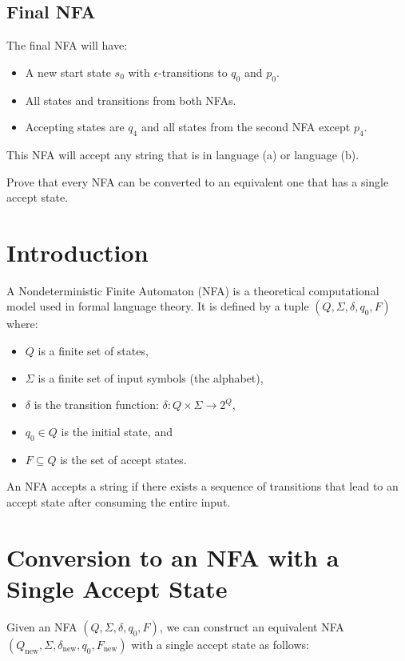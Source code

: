 \documentclass[12pt]{article}
\begin{document}
	\subsection*{Final NFA}
	The final NFA will have:
	\begin{itemize}
		\item A new start state $s_0$ with $\epsilon$-transitions to $q_0$ and $p_0$.
		\item All states and transitions from both NFAs.
		\item Accepting states are $q_4$ and all states from the second NFA except $p_4$.
	\end{itemize}
	
	This NFA will accept any string that is in language (a) or language (b).
	\newpage
	\begin{tcolorbox}[
		title=\textbf{Question 5},
		colback=white,
		colframe=transitioncol,
		arc=0mm
		]
		Prove that every NFA can be converted to an equivalent one that has a single accept state.
	\end{tcolorbox}
	\section{Introduction}
	A Nondeterministic Finite Automaton (NFA) is a theoretical computational model used in formal language theory. It is defined by a tuple $(Q, \Sigma, \delta, q_0, F)$ where:
	\begin{itemize}
		\item $Q$ is a finite set of states,
		\item $\Sigma$ is a finite set of input symbols (the alphabet),
		\item $\delta$ is the transition function: $\delta: Q \times \Sigma \to 2^Q$,
		\item $q_0 \in Q$ is the initial state, and
		\item $F \subseteq Q$ is the set of accept states.
	\end{itemize}
	An NFA accepts a string if there exists a sequence of transitions that lead to an accept state after consuming the entire input.
	
	\section{Conversion to an NFA with a Single Accept State}
	Given an NFA $(Q, \Sigma, \delta, q_0, F)$, we can construct an equivalent NFA $(Q_{\text{new}}, \Sigma, \delta_{\text{new}}, q_0, F_{\text{new}})$ with a single accept state as follows:
	
\end{document}
